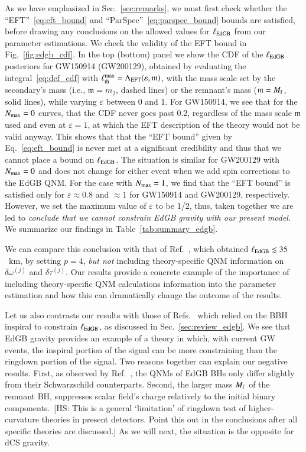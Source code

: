 \documentclass[twocolumn,
               prd,
               aps,
               superscriptaddress,
               tightenlines,
               nofootinbib,
               eqsecnum,
               amsfonts,
               amsmath,
               longbibliography]{revtex4-1}
\newcommand{\hscomm}[1]{{\textcolor{TealBlue}{{[HS: #1]}}}}
\begin{document}
As we have emphasized in Sec.~\ref{sec:remarks}, we must first check whether the
``EFT''~\eqref{eq:eft_bound} and ``ParSpec''~\eqref{eq:parspec_bound} bounds
are satisfied, before drawing any conclusions on the allowed values for
$\ell_{\rm EdGB}$ from our parameter estimations.
%
We check the validity of the EFT bound in Fig.~\ref{fig:edgb_cdf}. In the top (bottom) panel we show
the CDF of the $\ell_{\rm EdGB}$ posteriors for GW150914 (GW200129), obtained
by evaluating the integral~\eqref{eq:def_cdf} with $\ell^{\rm max}_{\rm th} = \Lambda_{\rm EFT}(\varepsilon, \mathfrak{m})$,
with the mass scale set by the secondary's mass (i.e., $\mathfrak{m} = m_2$, dashed lines) or
the remnant's mass ($\mathfrak{m} = M_{\rm f}$, solid lines), while varying $\varepsilon$ between 0 and 1.
%
For GW150914, we see that for the $N_{\rm max} = 0$ curves, that the CDF never goes
past $0.2$, regardless of the mass scale $\mathfrak{m}$ used and even at $\varepsilon =
1$, at which the EFT description of the theory would not be valid anyway.
%
This shows that that the ``EFT bound'' given by Eq.~\eqref{eq:eft_bound} is
never met at a significant credibility and thus that we cannot place a bound on
$\ell_{\rm EdGB}$.
%
The situation is similar for GW200129 with $N_{\rm max} = 0$ and does not
change for either event when we add spin corrections to the EdGB QNM.
%
For the case with $N_{\rm max} = 1$, we find that the ``EFT bound'' is satisfied
only for $\varepsilon \approx 0.8$ and $\approx1$ for GW150914 and GW200129, respectively.
However, we set the maximum value of $\varepsilon$ to be 1/2, thus,
taken together we are led to \emph{conclude that we cannot constrain EdGB gravity with our
present model}.
%
We summarize our findings in Table~\ref{tab:summary_edgb}.

We can compare this conclusion with that of Ref.~\cite{Carullo:2021dui}, which obtained $\ell_{\rm EdGB} \lesssim 35$~km,
by setting $p=4$, \emph{but not} including theory-specific QNM information on $\delta \omega^{(j)}$ and $\delta \tau^{(j)}$.
%
Our results provide a concrete example of the importance of including
theory-specific QNM calculations information into the parameter estimation
and how this can dramatically change the outcome of the results.

Let us also contrasts our results with those of Refs.~\cite{Nair:2019iur,Perkins:2021mhb,Lyu:2022gdr}
which relied on the BBH inspiral to constrain $\ell_{\rm EdGB}$, as discussed in Sec.~\ref{sec:review_edgb}.
%
We see that EdGB gravity provides an example of a theory in which, with current GW events, the inspiral portion
of the signal can be more constraining than the ringdown portion of the signal.
%
Two reasons together can explain our negative results. First, as observed by
Ref.~\cite{Blazquez-Salcedo:2016enn}, the QNMs of EdGB BHs only differ slightly
from their Schwarzschild counterparts. Second, the larger mass $M_{\rm f}$ of the
remnant BH, suppresses scalar field's charge relatively to the initial binary
components.~\hscomm{This is a general `limitation' of ringdown test of higher-curvature theories in present detectors.
Point this out in the conclusions after all specific theories are discussed.}
%
As we will next, the situation is the opposite for dCS gravity.
\end{document}
